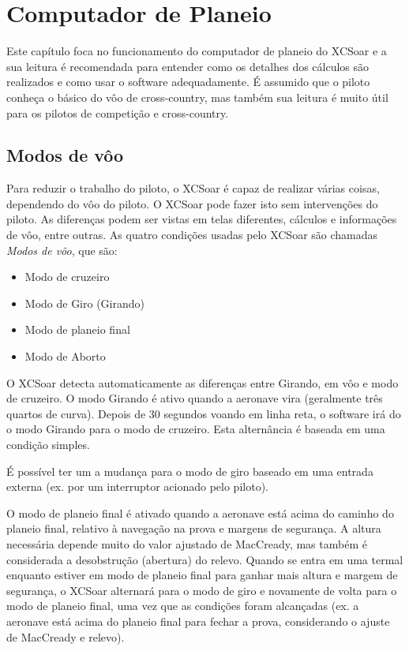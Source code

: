 \chapter{Computador de Planeio}\label{cha:glide}
Este capítulo foca no funcionamento do computador de planeio do XCSoar e a sua leitura é recomendada para entender como os detalhes dos cálculos são realizados e como usar o software adequadamente.  É assumido que o piloto conheça o básico do vôo de cross-country, mas também sua leitura é muito útil para os pilotos de competição e cross-country.


\section{Modos de vôo} \label{sec:flightmodes}

Para reduzir o trabalho do piloto, o XCSoar é capaz de realizar várias coisas, dependendo do vôo do piloto.  O XCSoar pode fazer isto sem intervenções do piloto.  As diferenças podem ser vistas em telas diferentes, cálculos e informações de vôo, entre outras.  As quatro condições usadas pelo XCSoar são chamadas 
\emph{Modos de vôo}, que são:
\begin{itemize}
\item Modo de cruzeiro
\item Modo de Giro (Girando)
\item Modo de planeio final
\item Modo de Aborto
\end{itemize}
O XCSoar detecta automaticamente as diferenças entre Girando, em vôo e modo de cruzeiro.  O modo Girando é ativo quando a aeronave vira (geralmente três quartos de curva).  Depois de 30 segundos voando em linha reta, o software irá do o modo Girando para o modo de cruzeiro.  Esta alternância é baseada em uma condição simples.

É possível ter um a mudança para o modo de giro baseado em uma entrada externa (ex. por um interruptor acionado pelo piloto).

O modo de planeio final é ativado quando a aeronave está acima do caminho do planeio final, relativo à navegação na prova e margens de segurança.  A altura necessária depende muito do valor ajustado de MacCready, mas também é considerada a desobstrução (abertura) do relevo.  Quando se entra em uma termal enquanto estiver em modo de planeio final para ganhar mais altura e margem de segurança, o XCSoar alternará para o modo de giro e novamente de volta para o modo de planeio final, uma vez que as condições foram alcançadas (ex. a aeronave está acima do planeio final para fechar a prova, considerando o ajuste de MacCready e relevo).

